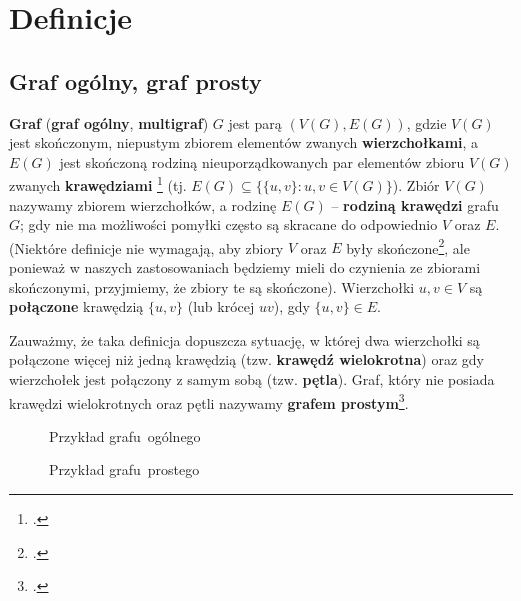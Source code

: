 \section{Definicje}

\subsection*{Graf ogólny, graf prosty}
\textbf{Graf} (\textbf{graf ogólny}, \textbf{multigraf}) $G$ jest parą $(V(G),E(G))$, gdzie $V(G)$ jest skończonym, niepustym zbiorem elementów zwanych \textbf{wierzchołkami}, a $E(G)$ jest skończoną rodziną nieuporządkowanych par elementów zbioru $V(G)$ zwanych \textbf{krawędziami} \footcite[20]{wilson} (tj. $E(G) \subseteq \{\{u,v\} : u,v \in V(G)\}$). Zbiór $V(G)$ nazywamy zbiorem wierzchołków, a rodzinę $E(G)$ -- \textbf{rodziną krawędzi} grafu $G$; gdy nie ma możliwości pomyłki często są skracane do odpowiednio $V$ oraz $E$. (Niektóre definicje nie wymagają, aby zbiory $V$ oraz $E$ były skończone\footcite[143]{ross}, ale ponieważ w naszych zastosowaniach będziemy mieli do czynienia ze zbiorami skończonymi, przyjmiemy, że zbiory te są skończone).  Wierzchołki $u,v \in V$ są \textbf{połączone} krawędzią $\{u,v\}$ (lub krócej $uv$), gdy $\{u,v\} \in E$. 

Zauważmy, że taka definicja dopuszcza sytuację, w której dwa wierzchołki są połączone więcej niż jedną krawędzią (tzw. \textbf{krawędź wielokrotna}) oraz gdy wierzchołek jest połączony z samym sobą (tzw. \textbf{pętla}). Graf, który nie posiada krawędzi wielokrotnych oraz pętli nazywamy \textbf{grafem prostym}\footcite[19]{wilson}.

\begin{figure}[h]
\centering
\begin{minipage}{.45\textwidth}
  \centering
\captionsetup{justification=centering}
\caption{Przykład grafu~ogólnego} \label{fig:simple-graph}
\end{minipage}
\begin{minipage}{.45\textwidth}
  \centering
\captionsetup{justification=centering}
\caption{Przykład grafu~prostego} \label{fig:graph}
\end{minipage}
\end{figure}

